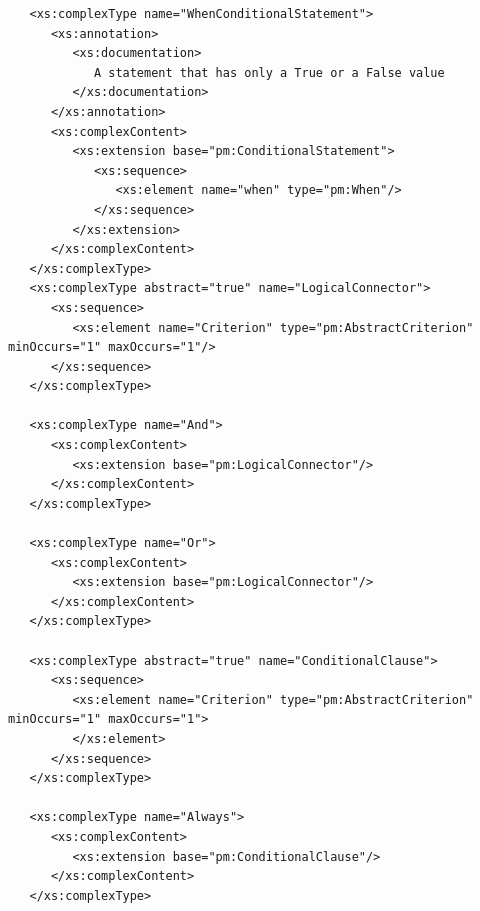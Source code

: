 \documentclass[a4paper,11pt] {ivoa}
\begin{document}
\begin{lstlisting}
   <xs:complexType name="WhenConditionalStatement">
      <xs:annotation>
         <xs:documentation>
            A statement that has only a True or a False value
         </xs:documentation>
      </xs:annotation>
      <xs:complexContent>
         <xs:extension base="pm:ConditionalStatement">
            <xs:sequence>
               <xs:element name="when" type="pm:When"/>
            </xs:sequence>
         </xs:extension>
      </xs:complexContent>
   </xs:complexType>
   <xs:complexType abstract="true" name="LogicalConnector">
      <xs:sequence>
         <xs:element name="Criterion" type="pm:AbstractCriterion" minOccurs="1" maxOccurs="1"/>
      </xs:sequence>
   </xs:complexType>

   <xs:complexType name="And">
      <xs:complexContent>
         <xs:extension base="pm:LogicalConnector"/>
      </xs:complexContent>
   </xs:complexType>

   <xs:complexType name="Or">
      <xs:complexContent>
         <xs:extension base="pm:LogicalConnector"/>
      </xs:complexContent>
   </xs:complexType>

   <xs:complexType abstract="true" name="ConditionalClause">
      <xs:sequence>
         <xs:element name="Criterion" type="pm:AbstractCriterion" minOccurs="1" maxOccurs="1">
         </xs:element>
      </xs:sequence>
   </xs:complexType>

   <xs:complexType name="Always">
      <xs:complexContent>
         <xs:extension base="pm:ConditionalClause"/>
      </xs:complexContent>
   </xs:complexType>


\end{lstlisting}
\end{document}
